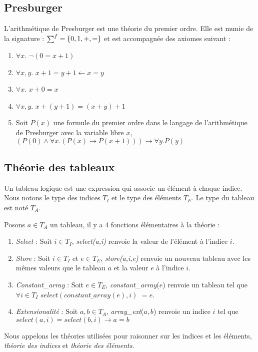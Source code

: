 \documentclass[11pt,openany]{article}
\newcommand\smallsum{\mathsmaller\sum}
\begin{document}
	\subsection{Presburger}
		L'arithm\'etique de Presburger est une th\'eorie du premier ordre. Elle est munie de la signature : $\smallsum^{f}=\{0,1,+,=\}$ et est accompagn\'ee des axiomes suivant :
		\begin{enumerate}
		\item $\forall x.$ $\neg(0=x+1)$
		\item $\forall x,y.$ $x + 1=y+1\leftarrow x=y$
		\item $\forall x.$ $x+0=x$
		\item $\forall x,y.$ $x+(y+1)=(x+y)+1$
		\item Soit $P(x)$ une formule du premier ordre dans le langage de l'arithm\'etique de Presburger avec la variable libre $x$,\\
		$(P(0)\land\forall x.(P(x)\rightarrow P(x+1)))\rightarrow\forall y. P(y)$
		\end{enumerate}
	\subsection{Th\'eorie des tableaux}	
		Un tableau logique est une expression qui associe un \'el\'ement \`a chaque indice. Nous notons le type des indices $T_{I}$ et le type des \'el\'ements $T_{E}$. Le type du tableau est not\'e $T_{A}$.
	
	Posons $a\in T_{A}$ un tableau, il y a 4 fonctions \'el\'ementaires \`a la th\'eorie :
	\begin{enumerate}
	\item \textit{Select} : Soit $i\in T_{I}$, \textit{select(a,i)} renvoie la valeur de l'\'el\'ement \`a l'indice $i$.
	\item \textit{Store} :  Soit $i\in T_{I}$ et $e\in T_{E}$, \textit{store(a,i,e)} renvoie un nouveau tableau avec les m\^emes valeurs que le tableau $a$ et la valeur $e$ \`a l'indice $i$.
	\item \textit{Constant_array} : Soit $e\in T_{E}$, \textit{constant\_array}($e$) renvoie un tableau tel que $\forall i\in T_{I}$ $select(constant\_array(e),i)$ $= e$.
	\item \textit{Extensionalit\'e} : Soit $a,b\in T_{A}$, \textit{array_ext}($a,b$) renvoie un indice $i$ tel que $select(a,i) = select(b,i)\rightarrow a = b $
	\end{enumerate}
	Nous appelons les th\'eories utilis\'ees pour raisonner sur les indices et les \'el\'ements, \textit{th\'eorie des indices} et \textit{th\'eorie des \'el\'ements}.
	
\end{document}
